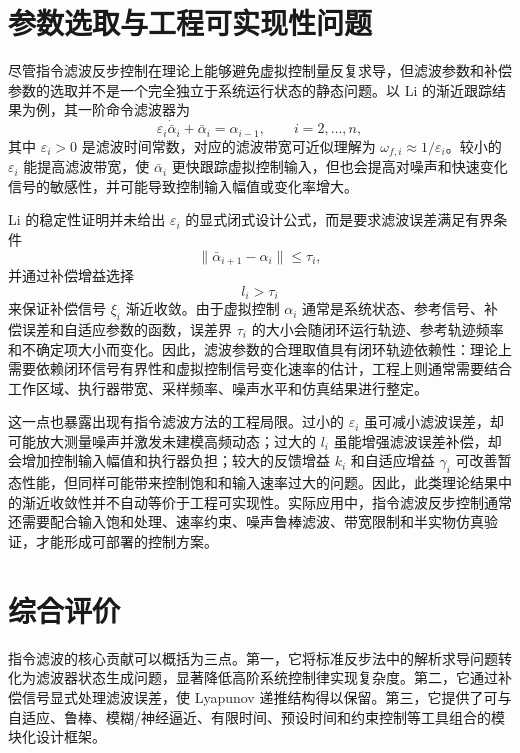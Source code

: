 \documentclass[UTF8,a4paper,11pt,fontset=fandol]{ctexart}
\begin{document}
\section{参数选取与工程可实现性问题}

尽管指令滤波反步控制在理论上能够避免虚拟控制量反复求导，但滤波参数和补偿参数的选取并不是一个完全独立于系统运行状态的静态问题。以 Li 的渐近跟踪结果为例，其一阶命令滤波器为
\begin{equation}
  \varepsilon_i\dot{\bar{\alpha}}_i+\bar{\alpha}_i=\alpha_{i-1},
  \qquad i=2,\ldots,n ,
\end{equation}
其中 $\varepsilon_i>0$ 是滤波时间常数，对应的滤波带宽可近似理解为 $\omega_{f,i}\approx 1/\varepsilon_i$。较小的 $\varepsilon_i$ 能提高滤波带宽，使 $\bar{\alpha}_i$ 更快跟踪虚拟控制输入，但也会提高对噪声和快速变化信号的敏感性，并可能导致控制输入幅值或变化率增大。

Li 的稳定性证明并未给出 $\varepsilon_i$ 的显式闭式设计公式，而是要求滤波误差满足有界条件
\begin{equation}
  \|\bar{\alpha}_{i+1}-\alpha_i\|\le \tau_i ,
\end{equation}
并通过补偿增益选择
\begin{equation}
  l_i>\tau_i
\end{equation}
来保证补偿信号 $\xi_i$ 渐近收敛。由于虚拟控制 $\alpha_i$ 通常是系统状态、参考信号、补偿误差和自适应参数的函数，误差界 $\tau_i$ 的大小会随闭环运行轨迹、参考轨迹频率和不确定项大小而变化。因此，滤波参数的合理取值具有闭环轨迹依赖性：理论上需要依赖闭环信号有界性和虚拟控制信号变化速率的估计，工程上则通常需要结合工作区域、执行器带宽、采样频率、噪声水平和仿真结果进行整定。

这一点也暴露出现有指令滤波方法的工程局限。过小的 $\varepsilon_i$ 虽可减小滤波误差，却可能放大测量噪声并激发未建模高频动态；过大的 $l_i$ 虽能增强滤波误差补偿，却会增加控制输入幅值和执行器负担；较大的反馈增益 $k_i$ 和自适应增益 $\gamma_i$ 可改善暂态性能，但同样可能带来控制饱和和输入速率过大的问题。因此，此类理论结果中的渐近收敛性并不自动等价于工程可实现性。实际应用中，指令滤波反步控制通常还需要配合输入饱和处理、速率约束、噪声鲁棒滤波、带宽限制和半实物仿真验证，才能形成可部署的控制方案。

\section{综合评价}

指令滤波的核心贡献可以概括为三点。第一，它将标准反步法中的解析求导问题转化为滤波器状态生成问题，显著降低高阶系统控制律实现复杂度。第二，它通过补偿信号显式处理滤波误差，使 Lyapunov 递推结构得以保留。第三，它提供了可与自适应、鲁棒、模糊/神经逼近、有限时间、预设时间和约束控制等工具组合的模块化设计框架。
\end{document}
